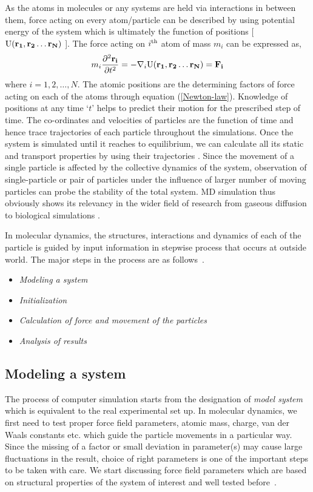 As the atoms in molecules or any systems are held via interactions in between them, force acting on every atom/particle can be described by using potential energy of the system which is ultimately the function of positions [${\rm U}(\mathbf{r_1, r_2 \ldots r_N})\ $]. The force acting on $i^{\rm th}$ atom of mass $m_i$ can be expressed as,  
\begin{equation}\label{Newton-law}
 m_i \frac {\partial^2 \mathbf{r_i}}{\partial t^2} = -\nabla_i {\rm U}(\mathbf{r_1, r_2 \ldots r_N}) = \mathbf{F_i}
\end{equation}
where $i = 1,2,\ldots,N$. The atomic positions are the determining factors of force acting on each of the atoms through equation (\ref{Newton-law}). Knowledge of positions at any time `{\it $t$}' helps to predict their motion for the prescribed step of time. The co-ordinates and velocities of particles are the function of time and hence trace trajectories of each particle throughout the simulations. Once the system is simulated until it reaches to equilibrium, we can calculate all its  static and transport properties by using their trajectories \citep{Frenkel2002}. Since the movement of a single particle is affected by the collective dynamics of the system, observation of single-particle or pair of particles under the influence of larger number of moving particles can probe the stability of the total system. MD simulation thus obviously shows its relevancy in the wider field of research from gaseous diffusion \citep{Poudyal2014, Pokhrel2016} to biological simulations \citep{Shimizu2002}. 

In molecular dynamics, the structures, interactions and dynamics of each of the particle is guided by input information in stepwise process that occurs at outside world. The major steps in the process are as follows~\citep{Gromacs-manual}.
\begin{itemize}
\item \emph{Modeling a system}
\item \emph{Initialization}
\item \emph{Calculation of force and movement of the particles}
\item \emph{Analysis of results}
\end{itemize}
\subsection{Modeling a system}
The process of computer simulation starts from the designation of {\it model system} which is equivalent to the real experimental set up. In molecular dynamics, we first need to test proper force field parameters, atomic mass, charge, van der Waals constants etc. which guide the particle movements in a particular way. Since the missing of a factor or small deviation in parameter(s) may cause large fluctuations in the result, choice of right parameters is one of the important steps to be taken with care. We start discussing force field parameters
which are based on structural properties of the system of interest and well tested before~\citep{Gromacs-manual}. 

